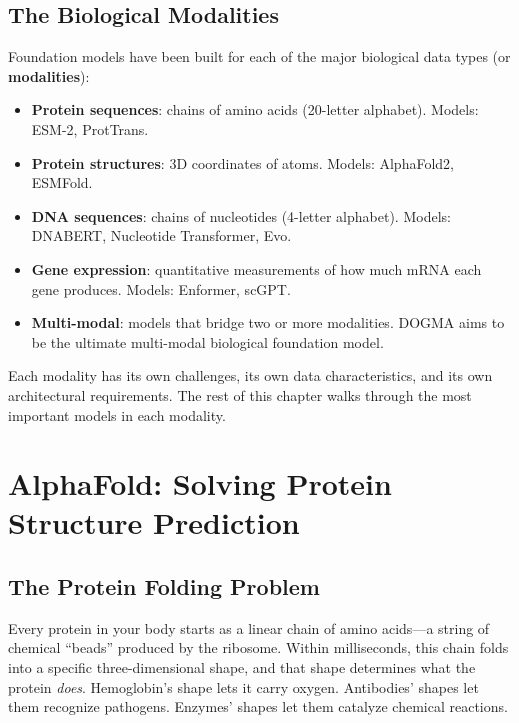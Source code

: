 \subsection{The Biological Modalities}

Foundation models have been built for each of the major biological data types (or \textbf{modalities}):

\begin{itemize}[leftmargin=1.5em]
  \item \textbf{Protein sequences}: chains of amino acids (20-letter alphabet). Models: ESM-2, ProtTrans.
  \item \textbf{Protein structures}: 3D coordinates of atoms. Models: AlphaFold2, ESMFold.
  \item \textbf{DNA sequences}: chains of nucleotides (4-letter alphabet). Models: DNABERT, Nucleotide Transformer, Evo.
  \item \textbf{Gene expression}: quantitative measurements of how much mRNA each gene produces. Models: Enformer, scGPT.
  \item \textbf{Multi-modal}: models that bridge two or more modalities. DOGMA aims to be the ultimate multi-modal biological foundation model.
\end{itemize}

Each modality has its own challenges, its own data characteristics, and its own architectural requirements. The rest of this chapter walks through the most important models in each modality.

\section{AlphaFold: Solving Protein Structure Prediction}
\label{sec:alphafold}

\subsection{The Protein Folding Problem}

Every protein in your body starts as a linear chain of amino acids---a string of chemical ``beads'' produced by the ribosome. Within milliseconds, this chain folds into a specific three-dimensional shape, and that shape determines what the protein \emph{does}. Hemoglobin's shape lets it carry oxygen. Antibodies' shapes let them recognize pathogens. Enzymes' shapes let them catalyze chemical reactions.

